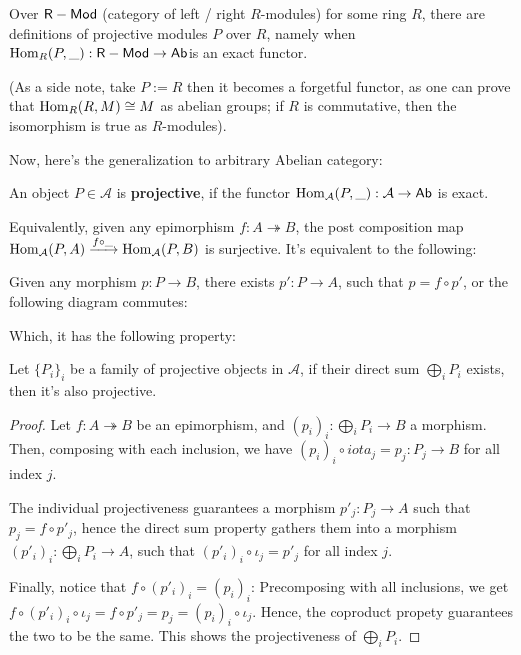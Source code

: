 \documentclass{article}
\begin{document}
\hfil

Over $\mathsf{R-Mod}$ (category of left / right $R$-modules) for some ring $R$, there are definitions of projective modules $P$ over $R$, namely when $\mathrm{Hom}_R(P,\_):\mathsf{R-Mod}\rightarrow \mathsf{Ab}$is an exact functor. 

(As a side note, take $P:=R$ then it becomes a forgetful functor, as one can prove that $\mathrm{Hom}_R(R,M)\cong M$ as abelian groups; if $R$ is commutative, then the isomorphism is true as $R$-modules). 

Now, here's the generalization to arbitrary Abelian category:
\begin{defn}
    An object $P\in \mathcal{A}$ is \textbf{projective}, if the functor $\mathrm{Hom}_\mathcal{A}(P,\_):\mathcal{A}\rightarrow \mathsf{Ab}$ is exact.

    \hfil

    Equivalently, given any epimorphism $f:A\twoheadrightarrow B$, the post composition map $\mathrm{Hom}_\mathcal{A}(P,A)\xrightarrow{f\circ \_}\mathrm{Hom}_\mathcal{A}(P,B)$ is surjective. It's equivalent to the following: 
    
    Given any morphism $p:P\rightarrow B$, there exists $p':P\rightarrow A$, such that $p = f\circ p'$, or the following diagram commutes:
    \begin{center}
    \end{center}
\end{defn}

Which, it has the following property:
\begin{prop}
    Let $\{P_i\}_i$ be a family of projective objects in $\mathcal{A}$, if their direct sum $\bigoplus_i P_i$ exists, then it's also projective.
\end{prop}
\begin{proof}
    Let $f:A\twoheadrightarrow B$ be an epimorphism, and $(p_i)_i:\bigoplus_i P_i\rightarrow B$ a morphism. Then, composing with each inclusion, we have $(p_i)_i \circ iota_j = p_j:P_j\rightarrow B$ for all index $j$. 

    The individual projectiveness guarantees a morphism $p'_j:P_j\rightarrow A$ such that $p_j=f\circ p'_j$, hence the direct sum property gathers them into a morphism $(p'_i)_i:\bigoplus_i P_i\rightarrow A$, such that $(p'_i)_i\circ \iota_j = p'_j$ for all index $j$.

    Finally, notice that $f\circ (p'_i)_i = (p_i)_i$: Precomposing with all inclusions, we get $f\circ (p'_i)_i\circ \iota_j = f\circ p'_j = p_j = (p_i)_i\circ \iota_j$. Hence, the coproduct propety guarantees the two to be the same. This shows the projectiveness of $\bigoplus_i P_i$.
\end{proof}
\end{document}
